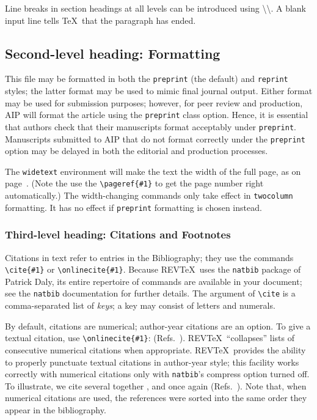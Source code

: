 \documentclass[%
 aip,
 amsmath,amssymb,
reprint, onecolumn %
]{revtex4-1}
\begin{document}
Line breaks in section headings at all levels can be introduced using
\textbackslash\textbackslash. A blank input line tells \TeX\ that the
paragraph has ended. 

\subsection{\label{sec:level2}Second-level heading: Formatting}

This file may be formatted in both the \texttt{preprint} (the default) and
\texttt{reprint} styles; the latter format may be used to 
mimic final journal output. Either format may be used for submission
purposes; however, for peer review and production, AIP will format the
article using the \texttt{preprint} class option. Hence, it is
essential that authors check that their manuscripts format acceptably
under \texttt{preprint}. Manuscripts submitted to AIP that do not
format correctly under the \texttt{preprint} option may be delayed in
both the editorial and production processes.

The \texttt{widetext} environment will make the text the width of the
full page, as on page~\pageref{eq:wideeq}. (Note the use the
\verb+\pageref{#1}+ to get the page number right automatically.) The
width-changing commands only take effect in \texttt{twocolumn}
formatting. It has no effect if \texttt{preprint} formatting is chosen
instead.

\subsubsection{\label{sec:level3}Third-level heading: Citations and Footnotes}

Citations in text refer to entries in the Bibliography;
they use the commands \verb+\cite{#1}+ or \verb+\onlinecite{#1}+. 
Because REV\TeX\ uses the \verb+natbib+ package of Patrick Daly, 
its entire repertoire of commands are available in your document;
see the \verb+natbib+ documentation for further details.
The argument of \verb+\cite+ is a comma-separated list of \emph{keys};
a key may consist of letters and numerals. 

By default, citations are numerical; \cite{feyn54} author-year citations are an option. 
To give a textual citation, use \verb+\onlinecite{#1}+: (Refs.~). 
REV\TeX\ ``collapses'' lists of consecutive numerical citations when appropriate. 
REV\TeX\ provides the ability to properly punctuate textual citations in author-year style;
this facility works correctly with numerical citations only with \texttt{natbib}'s compress option turned off. 
To illustrate, we cite several together \cite{feyn54,witten2001,epr,Berman1983}, 
and once again (Refs.~). 
Note that, when numerical citations are used, the references were sorted into the same order they appear in the bibliography. 
\end{document}
